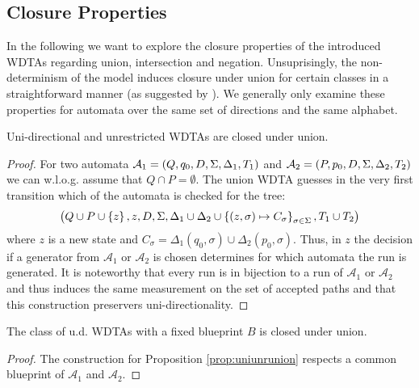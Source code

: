 \subsection{Closure Properties}
In the following we want to explore the closure properties of the introduced
\acp{WDTA} regarding union, intersection and negation. Unsuprisingly, the
non-determinism of the model induces closure under union for certain classes in
a straightforward manner (as suggested by \cite{RandAutoInfTrees}). We
generally only examine these properties for automata over the same set of
directions and the same alphabet.
\begin{proposition}
  Uni-directional and unrestricted \acp{WDTA} are closed under union.
  \label{prop:uniunrunion}
\end{proposition}
\begin{proof}
  For two automata
  $\mathcal{A}_{1} = \left(Q, q_{0}, D, \Sigma, \Delta_{1}, T_{1}\right)$ and
  $\mathcal{A}_{2} = \left(P, p_{0}, D, \Sigma, \Delta_{2}, T_{2}\right)$ we can
  w.l.o.g. assume that $Q\cap P = \emptyset$. The union \ac{WDTA} guesses in
  the very first transition which of the automata is checked for the tree:
  \begin{equation*}
    \left(Q\cup P\cup\left\{z\right\}, z, D, \Sigma,
    \Delta_{1}\cup\Delta_{2}\cup\left\{
      \left(z,\sigma\right)\mapsto C_{\sigma}\right\}_{\sigma\in\Sigma}, T_{1}\cup T_{2}\right)
  \end{equation*}
  where $z$ is a new state and
  $C_{\sigma} = \Delta_{1}(q_{0},\sigma)\cup\Delta_{2}(p_{0}, \sigma)$. Thus,
  in $z$ the decision if a generator from $\mathcal{A}_{1}$ or
  $\mathcal{A}_{2}$ is chosen determines for which automata the run is
  generated. It is noteworthy that every run is in bijection to a run of
  $\mathcal{A}_{1}$ or $\mathcal{A}_{2}$ and thus induces the same measurement
  on the set of accepted paths and that this construction preservers
  uni-directionality.
\end{proof}
\begin{corollary}
  The class of u.d. \acp{WDTA} with a fixed blueprint $B$ is closed under
  union.
\end{corollary}
\begin{proof}
  The construction for Proposition \ref{prop:uniunrunion} respects a common
  blueprint of $\mathcal{A}_{1}$ and $\mathcal{A}_{2}$.
\end{proof}

